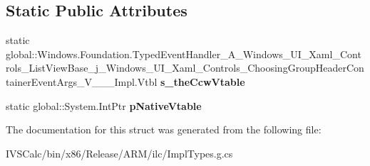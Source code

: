 \subsection*{Static Public Attributes}
\begin{DoxyCompactItemize}
\item 
\mbox{\label{struct_windows_1_1_foundation_1_1_typed_event_handler___a___windows___u_i___xaml___controls___li89c076cde303fbaf0fcbca1d0fe1cbb9_aa9eaf68f0d2e6b74383ed0913b72b39d}} 
static global\+::\+Windows.\+Foundation.\+Typed\+Event\+Handler\+\_\+\+A\+\_\+\+Windows\+\_\+\+U\+I\+\_\+\+Xaml\+\_\+\+Controls\+\_\+\+List\+View\+Base\+\_\+j\+\_\+\+Windows\+\_\+\+U\+I\+\_\+\+Xaml\+\_\+\+Controls\+\_\+\+Choosing\+Group\+Header\+Container\+Event\+Args\+\_\+\+V\+\_\+\+\_\+\+\_\+\+Impl.\+Vtbl {\bfseries s\+\_\+the\+Ccw\+Vtable}
\item 
\mbox{\label{struct_windows_1_1_foundation_1_1_typed_event_handler___a___windows___u_i___xaml___controls___li89c076cde303fbaf0fcbca1d0fe1cbb9_a6c4c6f3003fe522a98b80c974de69e8d}} 
static global\+::\+System.\+Int\+Ptr {\bfseries p\+Native\+Vtable}
\end{DoxyCompactItemize}


The documentation for this struct was generated from the following file\+:\begin{DoxyCompactItemize}
\item 
I\+V\+S\+Calc/bin/x86/\+Release/\+A\+R\+M/ilc/Impl\+Types.\+g.\+cs\end{DoxyCompactItemize}
